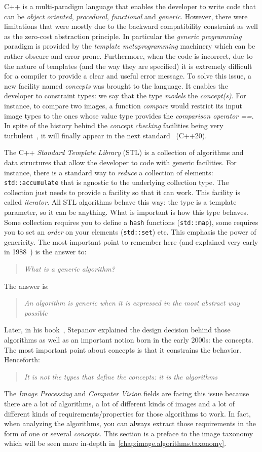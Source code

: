 C++ is a multi-paradigm language that enables the developer to write code that can be \emph{object oriented},
\emph{procedural}, \emph{functional} and \emph{generic}. However, there were limitations that were mostly due to the
backward compatibility constraint as well as the zero-cost abstraction principle. In particular the \emph{generic
  programming} paradigm is provided by the \emph{template metaprogramming} machinery which can be rather obscure and
error-prone. Furthermore, when the code is incorrect, due to the nature of templates (and the way they are specified) it
is extremely difficult for a compiler to provide a clear and useful error message. To solve this issue, a new facility
named \emph{concepts} was brought to the language. It enables the developer to constraint types: we say that the type
\emph{models} the \emph{concept(s)}. For instance, to compare two images, a function \emph{compare} would restrict its
input image types to the ones whose value type provides the \emph{comparison operator ==}. In spite of the history
behind the \emph{concept checking} facilities being very
turbulent~\parencite{seymour.2009.concepts,stroustrup.2003.concepts,sutton.2017.concepts}, it will finally appear in the
next standard~\parencite{voutilainen.2017.concepts} (C++20).

The C++ \emph{Standard Template Library} (STL) is a collection of algorithms and data structures that allow the
developer to code with generic facilities. For instance, there is a standard way to \emph{reduce} a collection of
elements: \texttt{std::accumulate} that is agnostic to the underlying collection type. The collection just needs to
provide a facility so that it can work. This facility is called \emph{iterator}. All STL algorithms behave this way: the
type is a template parameter, so it can be anything. What is important is how this type behaves. Some collection
requires you to define a \texttt{hash} functions (\texttt{std::map}), some requires you to set an \emph{order} on your
elements (\texttt{std::set}) etc. This emphasis the power of genericity. The most important point to remember here (and
explained very early in 1988~\parencite{musser.1988.generic}) is the answer to: \blockquote{\emph{What is a generic
    algorithm?}}. The answer is: \blockquote{\emph{An algorithm is generic when it is expressed in the most abstract way
    possible}}. Later, in his book~\parencite{stepanov.2009.elements}, Stepanov explained the design decision behind those
algorithms as well as an important notion born in the early 2000s: the concepts. The most important point about concepts
is that it constrains the behavior. Henceforth: \blockquote{\emph{It is not the types that define the concepts: it is
    the algorithms}}. The \emph{Image Processing} and \emph{Computer Vision} fields are facing this issue because there are
a lot of algorithms, a lot of different kinds of images and a lot of different kinds of requirements/properties for
those algorithms to work. In fact, when analyzing the algorithms, you can always extract those requirements in the form
of one or several \emph{concepts}. This section is a preface to the image taxonomy which will be seen more in-depth
in~\cref{chap:image.algorithms.taxonomy}.

